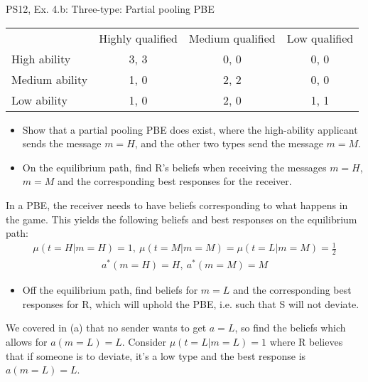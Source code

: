 \begin{frame}{PS12, Ex. 4.b: Three-type: Partial pooling PBE}
    \begin{table}
      \begin{tabular}{l|c|c|c|}
          \multicolumn{1}{c}{} & \multicolumn{1}{c}{Highly qualified} & \multicolumn{1}{c}{Medium qualified} & \multicolumn{1}{c}{Low qualified} \\\cline{2-4}
          High ability   & 3, 3 & 0, 0 & 0, 0 \\\cline{2-4}
          Medium ability & 1, 0 & 2, 2 & 0, 0 \\\cline{2-4}
          Low ability    & 1, 0 & 2, 0 & 1, 1 \\\cline{2-4}
      \end{tabular}
    \end{table}\vspace{-8pt}
    \begin{itemize}
      \item[(b)] Show that a partial pooling PBE does exist, where the high-ability applicant sends the message $m = H$, and the other two types send the message $m = M$.
      \item[Step 1:] On the equilibrium path, find R's beliefs when receiving the messages $m=H$, $m=M$ and the corresponding best responses for the receiver.
    \end{itemize}\vspace{-6pt}
    In a PBE, the receiver needs to have beliefs corresponding to what happens in the game. This yields the following beliefs and best responses on the equilibrium path:\vspace{-2pt}
    \begin{align*}
        \mu(t=H|m=H)=1,\
        \mu(t=M|m=M)=\mu(t=L|m=M)=\frac{1}{2}
    \end{align*}\vspace{-18pt}
    \begin{align*}
        a^*(m=H)=H,\ a^*(m=M)=M
    \end{align*}\vspace{-18pt}
    \begin{itemize}
      \item[Step 2:] Off the equilibrium path, find beliefs for $m=L$ and the corresponding best responses for R, which will uphold the PBE, i.e. such that S will not deviate.
    \end{itemize}\vspace{-6pt}
    We covered in (a) that no sender wants to get $a=L$, so find the beliefs which allows for $a(m=L)=L$. Consider $\mu(t=L|m=L)=1$ where R believes that if someone is to deviate, it's a low type and the best response is $a(m=L)=L$.\vspace{-2pt}

\end{frame}
